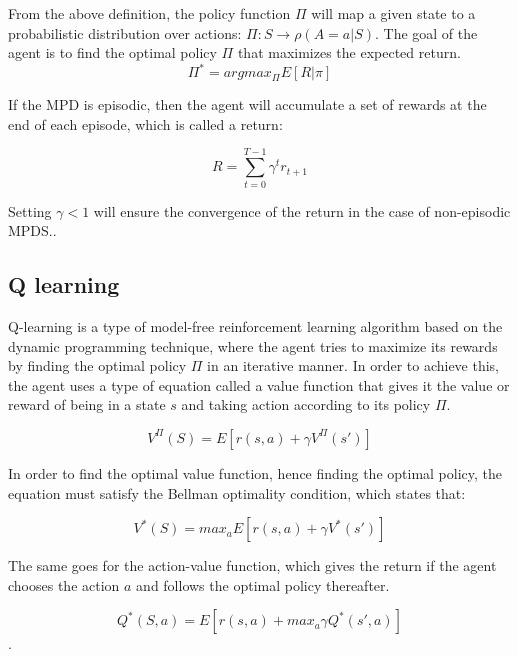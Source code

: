 \documentclass[12pt]{extarticle}
\begin{document}
\newpage
From the above definition, the policy function $\Pi$ will map a given state to a probabilistic distribution over actions: $\Pi: S \longrightarrow \rho(A=a|S)$. The goal of the agent is to find the optimal policy $\Pi$ that maximizes the expected return. \\
\[ \Pi^{*} = argmax_{\Pi}  E[R|\pi] \]



If the MPD is episodic, then the agent will accumulate a set of rewards at the end of each episode, which is called a return:

\[ R= \sum_{t=0}^{T-1} \gamma^{t}r_{t+1} \]



Setting $\gamma<1$ will ensure the convergence of the return in the case of non-episodic MPDS.\cite{arulkumaran2017brief}.

\subsection{Q learning}
Q-learning is a type of model-free reinforcement learning algorithm based on the dynamic programming technique, where the agent tries to maximize its rewards by finding the optimal policy $\Pi$ in an iterative manner. In order to achieve this, the agent uses a type of equation called a value function that gives it the value or reward of being in a state $s$ and taking action according to its policy $\Pi$.


\[ V^{\Pi}(S)=E[r(s,a)+\gamma V^{\Pi}(s') ] \] 

In order to find the optimal value function, hence finding the optimal policy, the equation must satisfy the Bellman optimality condition, which states that: 

  
\[ V^{*}(S)=max_{a}E[r(s,a)+\gamma V^{*}(s') ] \] 

The same goes for the action-value function, which gives the return if the agent chooses the action $a$ and follows the optimal policy thereafter.

\[ Q^{*}(S,a)=E[r(s,a)+max_{a}\gamma Q^{*}(s',a) ] \]\cite{watkins1992q}.


\pagebreak
\end{document}
